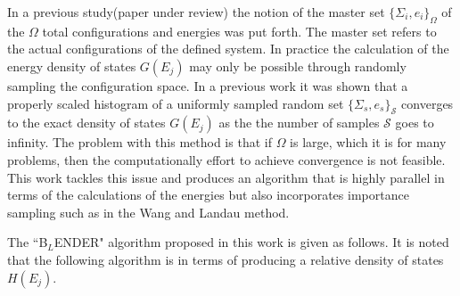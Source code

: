 \documentclass[aps,prl,reprint,superscriptaddress,showkeys]{revtex4-1}
\begin{document}
  In a previous study(paper under review) the notion of the master set $\{ \Sigma_i, e_i \}_\Omega $ of the $\Omega$ total configurations and energies was put forth. The master set refers to the actual configurations of the defined system. In practice the calculation of the energy density of states $G(E_j)$  may only be possible through randomly sampling the configuration space.  In a previous work it was shown that a properly scaled histogram of a uniformly sampled random set $\{ \Sigma_s, e_s \}_\mathcal{S}$ converges to the exact density of states $G(E_j)$ as the the number of samples $\mathcal{S}$ goes to infinity. The problem with this method is that if $\Omega$ is large, which it is for many problems,  then the computationally effort to achieve convergence is not feasible.  This work tackles this issue and produces an algorithm that is highly parallel in terms of the calculations of the energies  but also incorporates importance sampling such as in the Wang and Landau method.
   
The ``B$_{L}$ENDER" algorithm proposed in this work  is given as follows. It is noted that the following algorithm is in terms of producing a relative density of states $H(E_j)$. 
\end{document}
